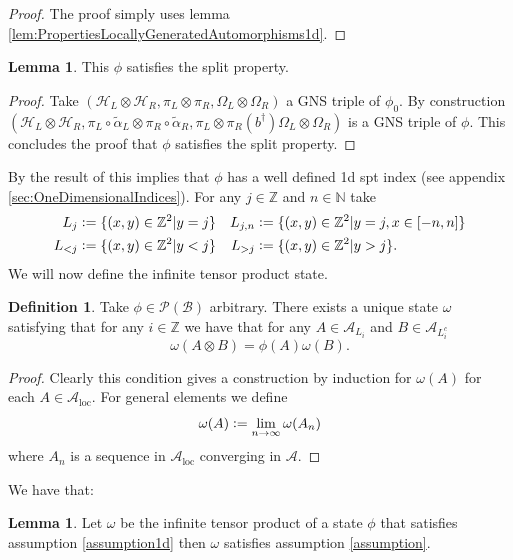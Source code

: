 \documentclass[12pt,a4paper,twoside]{article}
\newcommand{\defeq}{\vcentcolon=}
\newcommand{\BB}{\mathcal B}
\newcommand{\PP}{\mathcal P}
\newcommand{\HH}{\mathcal H}
\newcommand{\ZZ}{\mathbb Z}
\renewcommand{\AA}{\mathcal A}
\newcommand{\NN}{\mathbb{N}}
\theoremstyle{definition}
\newtheorem{definition}[theorem]{Definition}
\newtheorem{lemma}[theorem]{Lemma}
\numberwithin{equation}{section}
\begin{document}
\begin{proof}
	The proof simply uses lemma \ref{lem:PropertiesLocallyGeneratedAutomorphisms1d}.
\end{proof}
\begin{lemma}\label{lem:phiExampleConsistentWithConjectureSplitProperty}
	This $\phi$ satisfies the split property.
\end{lemma}
\begin{proof}
	Take $(\HH_L\otimes\HH_R,\pi_L\otimes\pi_R,\Omega_L\otimes\Omega_R)$ a GNS triple of $\phi_0$. By construction $(\HH_L\otimes\HH_R,\pi_L\circ\tilde\alpha_L\otimes\pi_R\circ\tilde\alpha_R,\pi_L\otimes\pi_R(b^\dagger)\Omega_L\otimes\Omega_R)$ is a GNS triple of $\phi$. This concludes the proof that $\phi$ satisfies the split property.
\end{proof}
By the result of \cite{ogata2019classification} this implies that $\phi$ has a well defined 1d spt index (see appendix \ref{sec:OneDimensionalIndices}). For any $j\in\ZZ$ and $n\in\NN$ take
\begin{align}
	L_j&\defeq \{(x,y)\in\ZZ^2|y=j\}&L_{j,n}&\defeq \{(x,y)\in\ZZ^2|y=j,x\in[-n,n]\}\\
	L_{<j}&\defeq \{(x,y)\in\ZZ^2|y<j\}&L_{>j}&\defeq \{(x,y)\in\ZZ^2|y>j\}.
\end{align}
We will now define the infinite tensor product state.
\begin{definition}\label{def:InfiniteTensorProductState}
	Take $\phi\in\PP(\BB)$ arbitrary. There exists a unique state $\omega$ satisfying that for any $i\in\ZZ$ we have that for any $A\in\AA_{L_i}$ and $B\in\AA_{L_i^c}$
	\begin{equation}
		\omega(A\otimes B)=\phi(A)\omega(B).
	\end{equation}
\end{definition}
\begin{proof}
	Clearly this condition gives a construction by induction for $\omega(A)$ for each $A\in\AA_{\text{loc}}$. For general elements we define
	\begin{equation}
		\omega(A)\defeq \lim_{n\rightarrow\infty}\omega(A_n)
	\end{equation}
	where $A_n$ is a sequence in $\AA_{\text{loc}}$ converging in $\AA$.
\end{proof}
We have that:
\begin{lemma}\label{lem:TensorProductStateHasWellDefinedH^2Index}
	Let $\omega$ be the infinite tensor product of a state $\phi$ that satisfies assumption \ref{assumption1d} then $\omega$ satisfies assumption \ref{assumption}.
\end{lemma}
\end{document}
